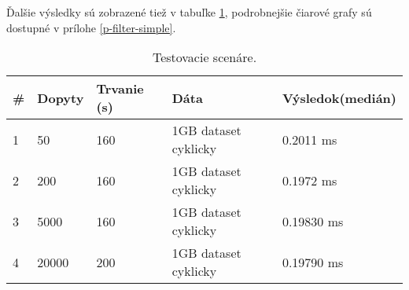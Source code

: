 Ďalšie výsledky sú zobrazené tiež v tabuľke \ref{tab-testy}, podrobnejšie čiarové grafy sú dostupné v prílohe \ref{p-filter-simple}.
\begin{table}[h!]
    \begin{tabular}{|l|l|l|l|l|}
    \hline
    \textbf{\#} & \textbf{Dopyty} & \textbf{Trvanie (s)} & \textbf{Dáta}                   & \textbf{Výsledok\newline(medián)} \\ \hline
    1  & 50            & 160                     & 1GB dataset cyklicky  & 0.2011 ms        \\ \hline
    2  & 200           & 160                     & 1GB dataset cyklicky  & 0.1972 ms      \\ \hline
    3  & 5000          & 160                     & 1GB dataset cyklicky  & 0.19830 ms       \\ \hline
    4  & 20000         & 200                     & 1GB dataset cyklicky  & 0.19790 ms       \\ \hline
    \end{tabular}
    \caption{Testovacie scenáre.}
	\label{tab-testy}
\end{table}

\label{fig:exp-podla-dopytu}


\label{fig:exp-podla-dopytu}



 \emptysinglepage
